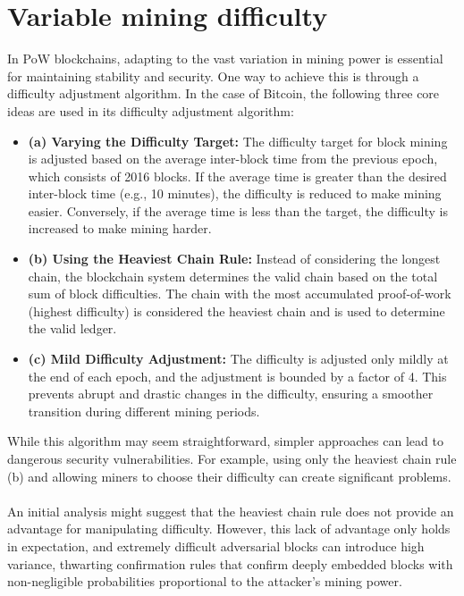 \section{Variable mining difficulty}
In PoW blockchains, adapting to the vast variation in mining power is essential for maintaining stability and security. One way to achieve this is through a difficulty adjustment algorithm. In the case of Bitcoin, the following three core ideas are used in its difficulty adjustment algorithm:\\
\begin{itemize}
    \item \textbf{(a) Varying the Difficulty Target: }The difficulty target for block mining is adjusted based on the average inter-block time from the previous epoch, which consists of 2016 blocks. If the average time is greater than the desired inter-block time (e.g., 10 minutes), the difficulty is reduced to make mining easier. Conversely, if the average time is less than the target, the difficulty is increased to make mining harder.
    \item \textbf{(b) Using the Heaviest Chain Rule: }Instead of considering the longest chain, the blockchain system determines the valid chain based on the total sum of block difficulties. The chain with the most accumulated proof-of-work (highest difficulty) is considered the heaviest chain and is used to determine the valid ledger.
    \item \textbf{(c) Mild Difficulty Adjustment: }The difficulty is adjusted only mildly at the end of each epoch, and the adjustment is bounded by a factor of 4. This prevents abrupt and drastic changes in the difficulty, ensuring a smoother transition during different mining periods.
\end{itemize}
While this algorithm may seem straightforward, simpler approaches can lead to dangerous security vulnerabilities. For example, using only the heaviest chain rule (b) and allowing miners to choose their difficulty can create significant problems.\\\\
An initial analysis might suggest that the heaviest chain rule does not provide an advantage for manipulating difficulty. However, this lack of advantage only holds in expectation, and extremely difficult adversarial blocks can introduce high variance, thwarting confirmation rules that confirm deeply embedded blocks with non-negligible probabilities proportional to the attacker's mining power\cite{reference1}.\\\\

